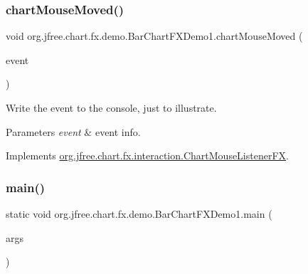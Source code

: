 \mbox{\label{classorg_1_1jfree_1_1chart_1_1fx_1_1demo_1_1_bar_chart_f_x_demo1_a4a857882137d18dc9aec3ef0811abf73}} 
\subsubsection{\texorpdfstring{chart\+Mouse\+Moved()}{chartMouseMoved()}}
{\footnotesize\ttfamily void org.\+jfree.\+chart.\+fx.\+demo.\+Bar\+Chart\+F\+X\+Demo1.\+chart\+Mouse\+Moved (\begin{DoxyParamCaption}\item[{\mbox{\hyperlink{classorg_1_1jfree_1_1chart_1_1fx_1_1interaction_1_1_chart_mouse_event_f_x}{Chart\+Mouse\+Event\+FX}}}]{event }\end{DoxyParamCaption})}

Write the event to the console, just to illustrate.


\begin{DoxyParams}{Parameters}
{\em event} & event info. \\
\hline
\end{DoxyParams}


Implements \mbox{\hyperlink{interfaceorg_1_1jfree_1_1chart_1_1fx_1_1interaction_1_1_chart_mouse_listener_f_x_aaf568a1fc8349de289cc6dbc39a277c2}{org.\+jfree.\+chart.\+fx.\+interaction.\+Chart\+Mouse\+Listener\+FX}}.

\mbox{\label{classorg_1_1jfree_1_1chart_1_1fx_1_1demo_1_1_bar_chart_f_x_demo1_ae2224667ea72d91951b866ed2158299b}} 
\subsubsection{\texorpdfstring{main()}{main()}}
{\footnotesize\ttfamily static void org.\+jfree.\+chart.\+fx.\+demo.\+Bar\+Chart\+F\+X\+Demo1.\+main (\begin{DoxyParamCaption}\item[{String \mbox{[}$\,$\mbox{]}}]{args }\end{DoxyParamCaption})\hspace{0.3cm}{\ttfamily [static]}}

